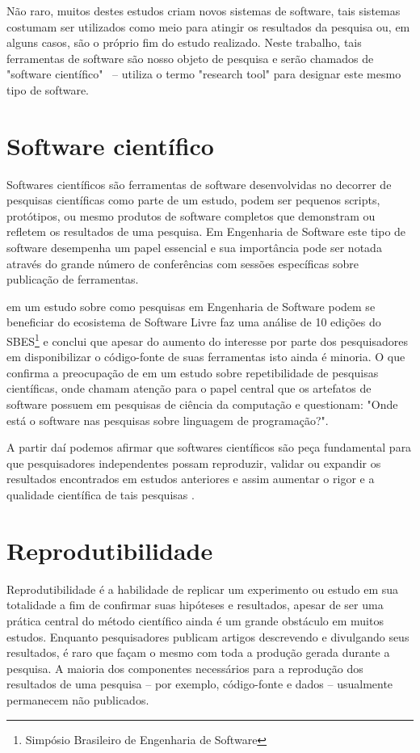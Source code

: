 \documentclass[qual, classic, a4paper]{ufbathesis}
\begin{document}
Não raro, muitos destes estudos criam novos sistemas de software, tais
sistemas costumam ser utilizados como meio para atingir os resultados da
pesquisa ou, em alguns casos, são o próprio fim do estudo realizado. Neste
trabalho, tais ferramentas de software são nosso objeto de pesquisa e serão
chamados de "software científico" \ --  utiliza o termo
"research tool" para designar este mesmo tipo de software.

\section{Software científico}

Softwares científicos são ferramentas de software desenvolvidas no decorrer de
pesquisas científicas como parte de um estudo, podem ser pequenos scripts,
protótipos, ou mesmo produtos de software completos que demonstram ou refletem
os resultados de uma pesquisa. Em Engenharia de Software este tipo de software
desempenha um papel essencial e sua importância pode ser notada através do
grande número de conferências com sessões específicas sobre publicação de
ferramentas.

 em um estudo sobre como pesquisas em Engenharia de
Software podem se beneficiar do ecosistema de Software Livre faz uma análise
de 10 edições do SBES\footnote{Simpósio Brasileiro de Engenharia de Software}
e conclui que apesar do aumento do interesse por parte dos pesquisadores em
disponibilizar o código-fonte de suas ferramentas isto ainda é minoria. O
que confirma a preocupação de  em um estudo
sobre repetibilidade de pesquisas científicas, onde chamam atenção para o papel
central que os artefatos de software possuem em pesquisas de ciência da
computação e questionam: "Onde está o software nas pesquisas sobre linguagem
de programação?".

A partir daí podemos afirmar que softwares científicos são peça fundamental
para que pesquisadores independentes possam reproduzir, validar ou expandir os
resultados encontrados em estudos anteriores e assim aumentar o rigor e a
qualidade científica de tais pesquisas \cite{Vitek2011}.

\section{Reprodutibilidade}

Reprodutibilidade é a habilidade de replicar um experimento ou estudo em sua
totalidade a fim de confirmar suas hipóteses e resultados, apesar de ser uma
prática central do método científico ainda é um grande obstáculo em muitos
estudos. Enquanto pesquisadores publicam artigos descrevendo e divulgando seus
resultados, é raro que façam o mesmo com toda a produção gerada durante a
pesquisa. A maioria dos componentes necessários para a reprodução dos
resultados de uma pesquisa -- por exemplo, código-fonte e dados -- usualmente
permanecem não publicados.
\end{document}
